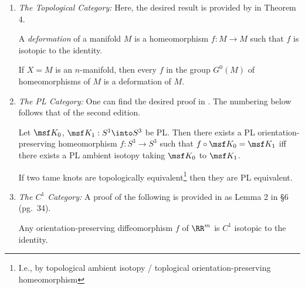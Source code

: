 \begin{enumerate}
  \item \emph{The Topological Category:} Here, the desired result is
    provided by \cite{Fisher} in Theorem 4.\hypertarget{link:equiv-in-top}{}
    \begin{leftbar}
      \begin{definition}
        A \emph{deformation} of a manifold $M$ is a homeomorphism $f :
        M \to M$ such that $f$ is isotopic to the identity.
      \end{definition}
      \begin{theorem}
        If $X = M$ is an $n$-manifold, then every $f$ in the group
        $G^0(M)$ of homeomorphisms of $M$ is a deformation of $M$.
      \end{theorem}
    \end{leftbar}
  \item \emph{The PL Category:} One can find the desired proof in
    \cite{burde2003knots}. The numbering below follows that of the
    second edition.\hypertarget{link:equiv-in-pl}{}
    \begin{leftbar}
      \begin{theorem}
        Let $\msf K_0$, $\msf K_1 : S^1\into S^3$ be PL. Then there
        exists a PL orientation-preserving homeomorphism $f : S^3 \to
        S^3$ such that $f\circ \msf K_0 = \msf K_1$ iff there exists a
        PL ambient isotopy taking $\msf K_0$ to $\msf K_1$.
      \end{theorem}
      \begin{corollary}
        If two tame knots are topologically equivalent\footnote{I.e.,
          by topological ambient isotopy / toplogical
          orientation-preserving homeomorphism} then they are PL
        equivalent.
      \end{corollary}
    \end{leftbar}
  \item \emph{The $C^1$ Category:} A proof of the following is
    provided in \cite{milnor1997topology} as Lemma 2 in \S 6 (pg.\
    34).
    \begin{leftbar}
      \begin{lemma}
        Any orientation-preserving diffeomorphism $f$ of $\RR^m$ is
        $C^1$ isotopic to the identity.
      \end{lemma}
    \end{leftbar}
\end{enumerate}
